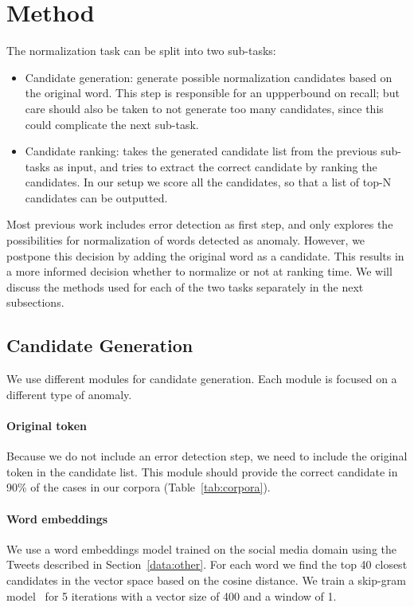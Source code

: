 \documentclass[a4paper,10pt,twoside]{article}
\begin{document}
\section{Method}
\label{sec:method}
The normalization task  can be split into two sub-tasks:
\begin{itemize}
\item Candidate generation: generate possible normalization candidates
based on the original word. This step is responsible for an uppperbound on
recall; but care should also be taken to not generate too many candidates, 
since this could complicate the next sub-task.
    \item Candidate ranking: takes the generated candidate list 
from the previous sub-tasks as input, and tries to extract the correct
candidate by ranking the candidates. In our setup we score all the 
candidates, so that a list of top-N candidates can be outputted.
\end{itemize}

Most previous work includes error detection as first step, and only explores
the possibilities for normalization of words detected as anomaly.  However,
we postpone this decision by adding the original word as a candidate.  This
results in a more informed decision whether to normalize or not at ranking
time. We will discuss the methods used for each of the two tasks separately in
the next subsections.



\subsection{Candidate Generation}
\label{method:gen}
We use different modules for candidate generation. Each module is focused on a 
different type of anomaly.

\paragraph{Original token}
Because we do not include an error detection step, we need to include the original
token in the candidate list. This module should provide the correct candidate
in 90\% of the cases in our corpora (Table~\ref{tab:corpora}).

\paragraph{Word embeddings} 
We use a word embeddings model trained on the social media domain using the
Tweets described in Section~\ref{data:other}. For each word we find the top 40
closest candidates in the vector space based on the cosine distance. We train a
skip-gram model~\cite{mikolov2013efficient} for 5 iterations with a
vector size of 400 and a window of 1. 
\end{document}
